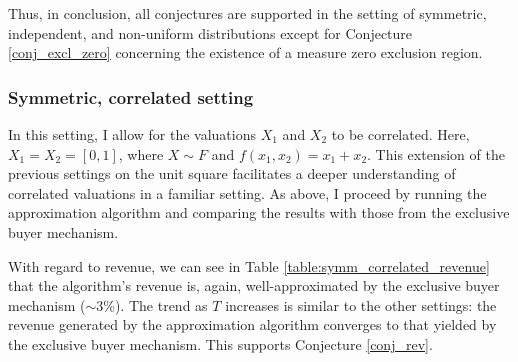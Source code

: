


  

Thus, in conclusion, all conjectures are supported in the setting of symmetric, independent, and non-uniform distributions except for Conjecture \ref{conj_excl_zero} concerning the existence of a measure zero exclusion region.







\subsubsection{Symmetric, correlated setting}

In this setting, I allow for the valuations $X_1$ and $X_2$ to be correlated. Here, $X_1 = X_2 = [0,1]$, where $X \sim F$ and $f(x_1,x_2) = x_1+x_2$. This extension of the previous settings on the unit square facilitates a deeper understanding of correlated valuations in a familiar setting. As above, I proceed by running the approximation algorithm and comparing the results with those from the exclusive buyer mechanism.

With regard to revenue, we can see in Table \ref{table:symm_correlated_revenue} that the algorithm's revenue is, again, well-approximated by the exclusive buyer mechanism ($\sim$3\%). The trend as $T$ increases is similar to the other settings: the revenue generated by the approximation algorithm converges to that yielded by the exclusive buyer mechanism. This supports Conjecture \ref{conj_rev}.


